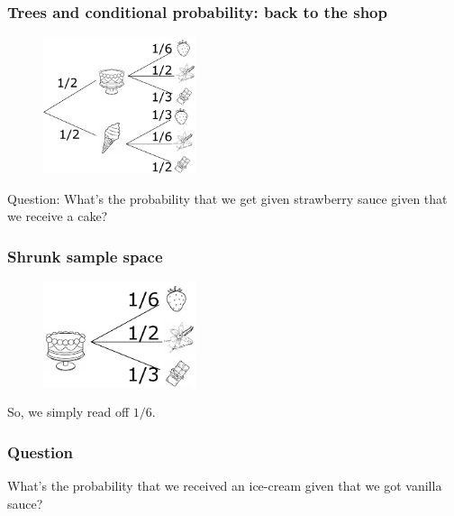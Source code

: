 \documentclass{beamer}
\begin{document}
	\begin{frame}
		\frametitle{Trees and conditional probability: back to the shop}
		
		\begin{figure}[ht]
			\centerline{\includegraphics[width=0.4\textwidth]{./figures/tree-prob-1.pdf}}
		\end{figure}
	
	Question: What's the probability that we get given strawberry sauce given that we receive a cake?
		
	\end{frame}

	\begin{frame}
		\frametitle{Shrunk sample space}
		
		\begin{figure}[ht]
			\centerline{\includegraphics[width=0.4\textwidth]{./figures/tree-prob-1-shrunk.pdf}}
		\end{figure}
	
	So, we simply read off $1/6$.
		
	\end{frame}

	\begin{frame}
		\frametitle{Question}
		
		What's the probability that we received an ice-cream given that we got vanilla sauce?
		
		
	\end{frame}
\end{document}
